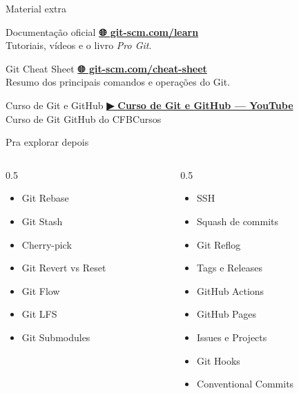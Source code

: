 \begin{frame}{Material extra}
  \begin{block}{Documentação oficial}
    \href{https://git-scm.com/learn}{\textbf{🌐 git-scm.com/learn}}
    \vspace{0.2cm} \\
    Tutoriais, vídeos e o livro \textit{Pro Git}.
  \end{block}
  \begin{block}{Git Cheat Sheet}
    \href{https://git-scm.com/cheat-sheet}{\textbf{🌐 git-scm.com/cheat-sheet}}
    \vspace{0.2cm} \\
    Resumo dos principais comandos e operações do Git.
  \end{block}
  \begin{block}{Curso de Git e GitHub}
    \href{https://www.youtube.com/playlist?list=PLx4x_zx8csUhopU45en_VDUS9hkze64xO}
    {\textbf{▶ Curso de Git e GitHub — YouTube}}
    \vspace{0.2cm} \\
    Curso de Git GitHub do CFBCursos
  \end{block}
\end{frame}

\begin{frame}{Pra explorar depois}
  \begin{columns}[T]
    \begin{column}{0.5\textwidth}
      \begin{itemize}
        \item Git Rebase
        \item Git Stash
        \item Cherry-pick
        \item Git Revert vs Reset
        \item Git Flow
        \item Git LFS
        \item Git Submodules
      \end{itemize}
    \end{column}
    \begin{column}{0.5\textwidth}
      \begin{itemize}
        \item SSH
        \item Squash de commits
        \item Git Reflog
        \item Tags e Releases
        \item GitHub Actions
        \item GitHub Pages
        \item Issues e Projects
        \item Git Hooks
        \item Conventional Commits
      \end{itemize}
    \end{column}
  \end{columns}
\end{frame}
